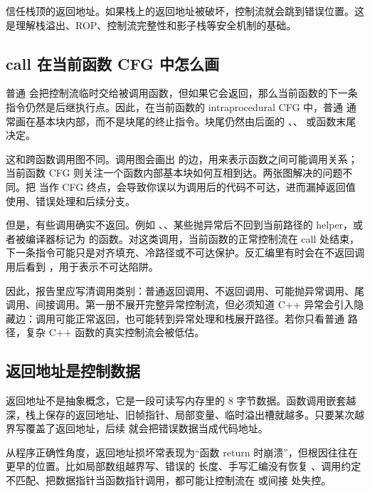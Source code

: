 \begin{warningbox}
 信任栈顶的返回地址。如果栈上的返回地址被破坏，控制流就会跳到错误位置。这是理解栈溢出、ROP、控制流完整性和影子栈等安全机制的基础。
\end{warningbox}

\subsection{call 在当前函数 CFG 中怎么画}

普通  会把控制流临时交给被调用函数，但如果它会返回，那么当前函数的下一条指令仍然是后继执行点。因此，在当前函数的 intraprocedural CFG 中，普通  通常画在基本块内部，而不是块尾的终止指令。块尾仍然由后面的 、、 或函数末尾决定。

这和跨函数调用图不同。调用图会画出  的边，用来表示函数之间可能调用关系；当前函数 CFG 则关注一个函数内部基本块如何互相到达。两张图解决的问题不同。把  当作 CFG 终点，会导致你误以为调用后的代码不可达，进而漏掉返回值使用、错误处理和后续分支。

但是，有些调用确实不返回。例如 、、某些抛异常后不回到当前路径的 helper，或者被编译器标记为 \code{[[noreturn]]} 的函数。对这类调用，当前函数的正常控制流在 call 处结束，下一条指令可能只是对齐填充、冷路径或不可达保护。反汇编里有时会在不返回调用后看到 ，用于表示不可达陷阱。

因此，报告里应写清调用类别：普通返回调用、不返回调用、可能抛异常调用、尾调用、间接调用。第一册不展开完整异常控制流，但必须知道 C++ 异常会引入隐藏边：调用可能正常返回，也可能转到异常处理和栈展开路径。若你只看普通  路径，复杂 C++ 函数的真实控制流会被低估。

\subsection{返回地址是控制数据}

返回地址不是抽象概念，它是一段可读写内存里的 8 字节数据。函数调用嵌套越深，栈上保存的返回地址、旧帧指针、局部变量、临时溢出槽就越多。只要某次越界写覆盖了返回地址，后续  就会把错误数据当成代码地址。

从程序正确性角度，返回地址损坏常表现为“函数 return 时崩溃”，但根因往往在更早的位置。比如局部数组越界写、错误的  长度、手写汇编没有恢复 、调用约定不匹配、把数据指针当函数指针调用，都可能让控制流在  或间接  处失控。

